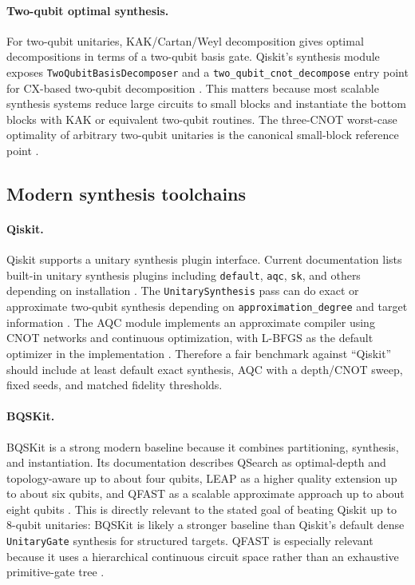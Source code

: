\documentclass[11pt,a4paper]{article}
\begin{document}
\paragraph{Two-qubit optimal synthesis.}
For two-qubit unitaries, KAK/Cartan/Weyl decomposition gives optimal
decompositions in terms of a two-qubit basis gate. Qiskit's synthesis module
exposes \texttt{TwoQubitBasisDecomposer} and a \texttt{two\_qubit\_cnot\_decompose}
entry point for CX-based two-qubit decomposition \cite{qiskit_synthesis}.
This matters because most scalable synthesis systems reduce large circuits
to small blocks and instantiate the bottom blocks with KAK or equivalent
two-qubit routines. The three-CNOT worst-case optimality of arbitrary
two-qubit unitaries is the canonical small-block reference point
\cite{shende2004minimal}.

\subsection{Modern synthesis toolchains}

\paragraph{Qiskit.}
Qiskit supports a unitary synthesis plugin interface. Current documentation
lists built-in unitary synthesis plugins including \texttt{default},
\texttt{aqc}, \texttt{sk}, and others depending on installation
\cite{qiskit_plugins}. The \texttt{UnitarySynthesis} pass can do exact or
approximate two-qubit synthesis depending on \texttt{approximation\_degree}
and target information \cite{qiskit_unitary_synthesis}. The AQC module
implements an approximate compiler using CNOT networks and continuous
optimization, with L-BFGS as the default optimizer in the implementation
\cite{qiskit_aqc,madden2021aqc}. Therefore a fair benchmark against
``Qiskit'' should include at least default exact synthesis, AQC with a
depth/CNOT sweep, fixed seeds, and matched fidelity thresholds.

\paragraph{BQSKit.}
BQSKit is a strong modern baseline because it combines partitioning,
synthesis, and instantiation. Its documentation describes QSearch as
optimal-depth and topology-aware up to about four qubits, LEAP as a higher
quality extension up to about six qubits, and QFAST as a scalable approximate
approach up to about eight qubits \cite{bqskit_home,bqskit_synthesis}. This
is directly relevant to the stated goal of beating Qiskit up to 8-qubit
unitaries: BQSKit is likely a stronger baseline than Qiskit's default dense
\texttt{UnitaryGate} synthesis for structured targets. QFAST is especially
relevant because it uses a hierarchical continuous circuit space rather than
an exhaustive primitive-gate tree \cite{qfast2020}.
\end{document}
